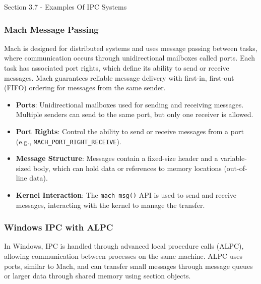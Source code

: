 \begin{notes}{Section 3.7 - Examples Of IPC Systems}
    \subsubsection*{Mach Message Passing}
    
    Mach is designed for distributed systems and uses message passing between tasks, where communication occurs through unidirectional mailboxes called ports. Each task has associated port rights, 
    which define its ability to send or receive messages. Mach guarantees reliable message delivery with first-in, first-out (FIFO) ordering for messages from the same sender.
    
    \begin{highlight}
    
        \begin{itemize}
            \item \textbf{Ports}: Unidirectional mailboxes used for sending and receiving messages. Multiple senders can send to the same port, but only one receiver is allowed.
            \item \textbf{Port Rights}: Control the ability to send or receive messages from a port (e.g., \texttt{MACH\_PORT\_RIGHT\_RECEIVE}).
            \item \textbf{Message Structure}: Messages contain a fixed-size header and a variable-sized body, which can hold data or references to memory locations (out-of-line data).
            \item \textbf{Kernel Interaction}: The \texttt{mach\_msg()} API is used to send and receive messages, interacting with the kernel to manage the transfer.
        \end{itemize}
    
    \end{highlight}
    
    \subsubsection*{Windows IPC with ALPC}
    
    In Windows, IPC is handled through advanced local procedure calls (ALPC), allowing communication between processes on the same machine. ALPC uses ports, similar to Mach, and can transfer small 
    messages through message queues or larger data through shared memory using section objects.
    
    \begin{highlight}
    

\end{highlight}
\end{notes}
